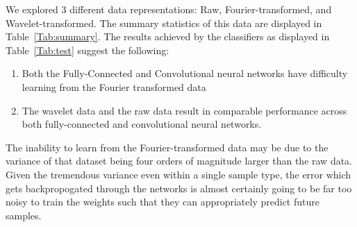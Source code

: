  \label{data representation}
We explored 3 different data representations: Raw, Fourier-transformed, and Wavelet-transformed.
The summary statistics of this data are displayed in Table~\ref{Tab:summary}.
The results achieved by the classifiers as displayed in Table~\ref{Tab:test} suggest the following:
\begin{enumerate}
\item Both the Fully-Connected and Convolutional neural networks have difficulty learning from the Fourier transformed data
\item The wavelet data and the raw data result in comparable performance across both fully-connected and convolutional neural networks.
\end{enumerate}

The inability to learn from the Fourier-transformed data may be due to the variance of that dataset being four orders of magnitude larger than the raw data.
Given the tremendous variance even within a single sample type, the error which gets backpropogated through the networks is almost certainly going to be far too noisy to train the weights such that they can appropriately predict future samples. 
